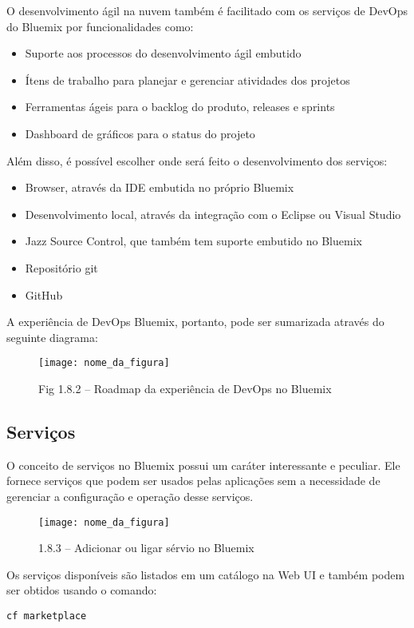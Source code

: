 O desenvolvimento ágil na nuvem também é facilitado com os serviços de DevOps do Bluemix por funcionalidades como:
\begin{itemize}
    \item Suporte aos processos do desenvolvimento ágil embutido
    \item Ítens de trabalho para planejar e gerenciar atividades dos projetos
    \item Ferramentas ágeis para o backlog do produto, releases e sprints
    \item Dashboard de gráficos para o status do projeto
\end{itemize}

Além disso, é possível escolher onde será feito o desenvolvimento dos serviços:
\begin{itemize}
  \item Browser, através da IDE embutida no próprio Bluemix
  \item Desenvolvimento local, através da integração com o Eclipse ou Visual Studio
  \item Jazz Source Control, que também tem suporte embutido no Bluemix
  \item Repositório git
  \item GitHub
\end{itemize}
A experiência de DevOps Bluemix, portanto, pode ser sumarizada através do seguinte diagrama:
\begin{figure}[!htb]
    \centering
    \texttt{[image: nome\_da\_figura]}
    \caption{Fig 1.8.2 – Roadmap da experiência de DevOps no Bluemix}
    \label{Rotulo}
\end{figure}

\subsection{Serviços}

O conceito de serviços no Bluemix possui um caráter interessante e peculiar. Ele fornece serviços que podem ser usados pelas aplicações sem a necessidade de gerenciar a configuração e operação desse serviços.

\begin{figure}[!htb]
    \centering
    \texttt{[image: nome\_da\_figura]}
    \caption{1.8.3 – Adicionar ou ligar sérvio no Bluemix}
    \label{Rotulo}
\end{figure}

Os serviços disponíveis são listados em um catálogo na Web UI e também podem ser obtidos usando o comando:
\begin{lstlisting}
cf marketplace
\end{lstlisting}

